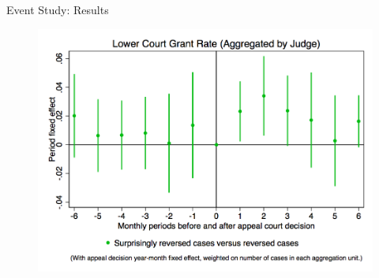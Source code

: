 \begin{frame}{Event Study: Results}
    \begin{figure}
        \centering
        \includegraphics[height = 0.7 \textheight]{images/int_mth1_2.png}
    \end{figure}
    
\end{frame}

